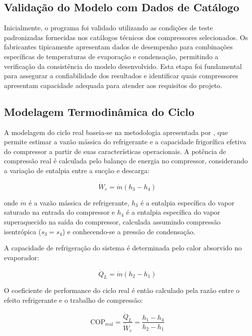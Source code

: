 \subsection{Validação do Modelo com Dados de Catálogo}

Inicialmente, o programa foi validado utilizando as condições de teste padronizadas fornecidas nos catálogos técnicos dos compressores selecionados. Os fabricantes tipicamente apresentam dados de desempenho para combinações específicas de temperaturas de evaporação e condensação, permitindo a verificação da consistência do modelo desenvolvido. Esta etapa foi fundamental para assegurar a confiabilidade dos resultados e identificar quais compressores apresentam capacidade adequada para atender aos requisitos do projeto.

\subsection{Modelagem Termodinâmica do Ciclo}

A modelagem do ciclo real baseia-se na metodologia apresentada por \cite{paper_referencia}, que permite estimar a vazão mássica do refrigerante e a capacidade frigorífica efetiva do compressor a partir de suas características operacionais. A potência de compressão real é calculada pelo balanço de energia no compressor, considerando a variação de entalpia entre a sucção e descarga:

\begin{equation}
    \dot{W}_c = \dot{m}(h_3 - h_4)
    \label{W compressor}
\end{equation}

\noindent onde $\dot{m}$ é a vazão mássica de refrigerante, $h_3$ é a entalpia específica do vapor saturado na entrada do compressor e $h_4$ é a entalpia específica do vapor superaquecido na saída do compressor, calculada assumindo compressão isentrópica ($s_3 = s_4$) e conhecendo-se a pressão de condensação.

A capacidade de refrigeração do sistema é determinada pelo calor absorvido no evaporador:

\begin{equation}
    \dot{Q}_L = \dot{m}(h_2 - h_1)
    \label{capacidade evaporador}
\end{equation}

O coeficiente de performance do ciclo real é então calculado pela razão entre o efeito refrigerante e o trabalho de compressão:

\begin{equation}
    \text{COP}_{\text{real}} = \frac{\dot{Q}_L}{\dot{W}_c} = \frac{h_1 - h_4}{h_2 - h_1}
    \label{cop real}
\end{equation}


